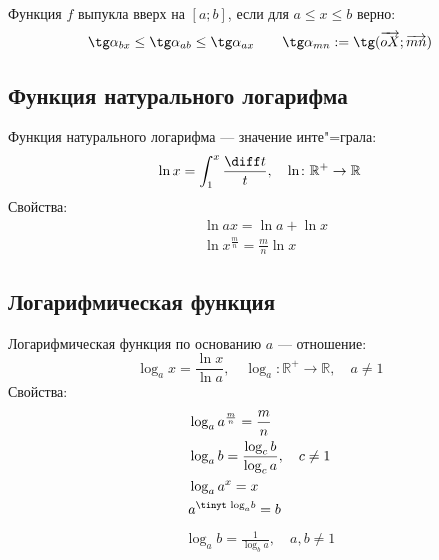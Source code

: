 Функция $f$ выпукла вверх на $[a;b]$, если для $a\leq x\leq b$ верно:
$$\tg\alpha_{bx}\leq\tg\alpha_{ab}\leq\tg\alpha_{ax}\quad\quad\tg\alpha_{mn}:=\tg
(\overrightarrow{oX};\overrightarrow{mn})$$

\subsection{Функция натурального логарифма}

{\bold Функция натурального логарифма} --- значение инте"=грала:
$$\ln x=\int_1^x\frac{\diff t}{t},\quad\ln\colon\mathbb{R}^+\to\mathbb{R}$$
Свойства:
\begin{align*}
&\ln ax=\ln a+\ln x\\
&\ln x^{\frac{m}{n}}=\frac{m}{n}\ln x
\end{align*}

\subsection{Логарифмическая функция}

{\bold Логарифмическая функция} по основанию $a$ --- отношение:
$$\log_ax=\frac{\ln x}{\ln a},\quad\log_a\colon\mathbb{R}^+\to\mathbb{R},\quad a\neq 1$$
Свойства:
\begin{align*}
&\log_aa^{\frac{m}{n}}=\frac{m}{n}\\
&\log_ab=\frac{\log_cb}{\log_ca},\quad c\neq 1\\
&\log_aa^x=x\\
&a^{\text{\tinyt log}_ab}=b
\end{align*}
\begin{align*}
\log_ab=\frac{1}{\log_ba},\quad a,b\neq 1
\end{align*}

